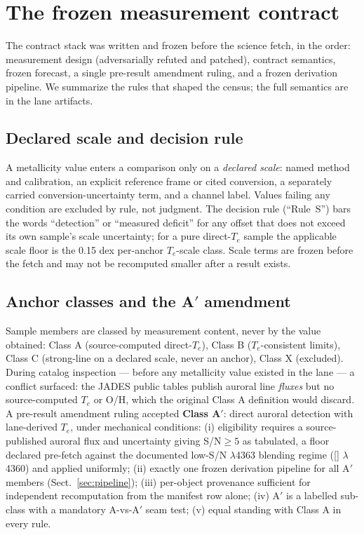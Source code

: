 \documentclass[twocolumn]{aastex702}
\newcommand{\te}{$T_e$}
\begin{document}
\section{The frozen measurement contract}\label{sec:contract}

The contract stack was written and frozen before the science fetch, in the order:
measurement design (adversarially refuted and patched), contract semantics, frozen
forecast, a single pre-result amendment ruling, and a frozen derivation pipeline.
We summarize the rules that shaped the census; the full semantics are in the lane
artifacts.

\subsection{Declared scale and decision rule}\label{sec:rule_s}

A metallicity value enters a comparison only on a \emph{declared scale}: named
method and calibration, an explicit reference frame or cited conversion, a
separately carried conversion-uncertainty term, and a channel label. Values failing
any condition are excluded by rule, not judgment. The decision rule (``Rule~S'')
bars the words ``detection'' or ``measured deficit'' for any offset that does not
exceed its own sample's scale uncertainty; for a pure direct-\te{} sample the
applicable scale floor is the 0.15 dex per-anchor \te{}-scale class. Scale terms are
frozen before the fetch and may not be recomputed smaller after a result exists.

\subsection{Anchor classes and the A$'$ amendment}\label{sec:aprime}

Sample members are classed by measurement content, never by the value obtained:
Class A (source-computed direct-\te{}), Class B (\te{}-consistent limits), Class C
(strong-line on a declared scale, never an anchor), Class X (excluded). During
catalog inspection — before any metallicity value existed in the lane — a conflict
surfaced: the JADES public tables publish auroral line \emph{fluxes} but no
source-computed \te{} or O/H, which the original Class A definition would discard.
A pre-result amendment ruling accepted \textbf{Class A$'$}: direct auroral
detection with lane-derived \te{}, under mechanical conditions: (i) eligibility
requires a source-published auroral flux and uncertainty giving
S/N$\geq5$ as tabulated, a floor declared pre-fetch against the documented
low-S/N $\lambda$4363 blending regime ([] $\lambda$4360) and applied
uniformly; (ii) exactly one frozen derivation pipeline for all A$'$ members
(Sect.~\ref{sec:pipeline}); (iii) per-object provenance sufficient for independent
recomputation from the manifest row alone; (iv) A$'$ is a labelled sub-class with a
mandatory A-vs-A$'$ seam test; (v) equal standing with Class A in every rule.
\end{document}
